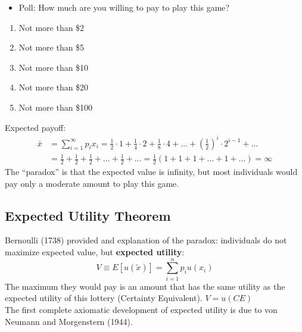 \documentclass[
14pt,notheorems,hyperref={pdfauthor=whatever}
]{beamer}
\begin{document}
\begin{frame}
\begin{itemize}
    \item Poll: How much are you willing to pay to play this game?
\end{itemize}
\hfill \break
\begin{enumerate}
\setlength{\itemindent}{.5in}
    \item Not more than \$2
    \item Not more than \$5
    \item Not more than \$10
    \item Not more than \$20
    \item Not more than \$100
\end{enumerate}
\end{frame}

\begin{frame}
Expected payoff:
\begin{align*}
    \bar{x} &= \sum_{i=1}^{\infty}p_i x_i = \frac{1}{2}\cdot1 + \frac{1}{4}\cdot2+ \frac{1}{8}\cdot4 + ... + (\frac{1}{2})^i \cdot2^{i-1} + ...\\
    &= \frac{1}{2} + \frac{1}{2} + \frac{1}{2} + ... + \frac{1}{2} + ... = \frac{1}{2} (1+1+1+...+1+...) = \infty
\end{align*}
The “paradox” is that the expected value is infinity, but most individuals would pay only a moderate amount to play this game.
\end{frame}


\subsection{Expected Utility Theorem}

\begin{frame}
Bernoulli (1738) provided and explanation of the paradox: individuals do not maximize expected value, but \textbf{expected utility}:
\[ V \equiv E[u(\tilde{x})] = \sum_{i=1}^n p_i u(x_i)\]
The maximum they would pay is an amount that has the same utility as the expected utility of this lottery (Certainty Equivalent). $V=u(CE)$\\
The first complete axiomatic development of expected utility is due to von Neumann and Morgenstern (1944).
\end{frame}
\end{document}
